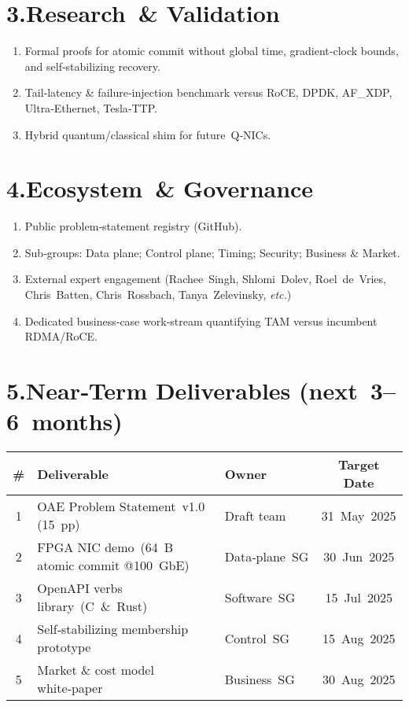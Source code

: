 \documentclass[HFT-main.tex]{subfiles}
\begin{document}
\section*{3.\quad Research \& Validation}
\begin{enumerate}
\item Formal proofs for atomic commit without global time, gradient‑clock bounds, and self‑stabilizing recovery.
\item Tail‑latency \& failure‑injection benchmark versus RoCE, DPDK, AF\_XDP, Ultra‑Ethernet, Tesla‑TTP.
\item Hybrid quantum/classical shim for future Q‑NICs.
\end{enumerate}

\section*{4.\quad Ecosystem \& Governance}
\begin{enumerate}
\item Public problem‑statement registry (GitHub).
\item Sub‑groups: Data plane; Control plane; Timing; Security; Business \& Market.
\item External expert engagement (Rachee Singh, Shlomi Dolev, Roel de Vries, Chris Batten, Chris Rossbach, Tanya Zelevinsky, \textit{etc.})
\item Dedicated business‑case work‑stream quantifying TAM versus incumbent RDMA/RoCE.
\end{enumerate}

\section*{5.\quad Near‑Term Deliverables (next 3–6 months)}
\footnotesize
\begin{center}
\begin{tabular}{@{}cllc@{}}
\toprule
\# & \textbf{Deliverable} & \textbf{Owner} & \textbf{Target Date}\\
\midrule
1 & OAE Problem Statement v1.0 (15 pp) & Draft team & 31 May 2025\\
2 & FPGA NIC demo (64 B atomic commit @100 GbE) & Data‑plane SG & 30 Jun 2025\\
3 & OpenAPI verbs library (C \& Rust) & Software SG & 15 Jul 2025\\
4 & Self‑stabilizing membership prototype & Control SG & 15 Aug 2025\\
5 & Market \& cost model white‑paper & Business SG & 30 Aug 2025\\
\bottomrule
\end{tabular}
\end{center}
\end{document}
